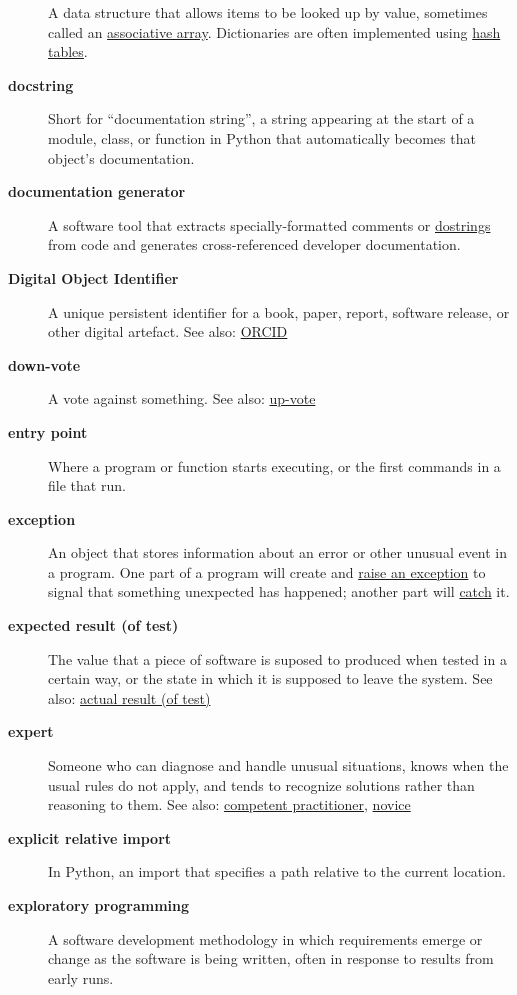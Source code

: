 \documentclass[
]{krantz}
\begin{document}
\begin{description}
A data structure that allows items to be looked up by value, sometimes called an \protect\hyperlink{associative_array}{associative array}. Dictionaries are often implemented using \protect\hyperlink{hash_table}{hash tables}.
\item[\textbf{docstring}]
Short for ``documentation string'', a string appearing at the start of a module, class, or function in Python that automatically becomes that object's documentation.
\item[\textbf{documentation generator}]
A software tool that extracts specially-formatted comments or \protect\hyperlink{docstring}{dostrings} from code and generates cross-referenced developer documentation.
\item[\textbf{Digital Object Identifier}]
A unique persistent identifier for a book, paper, report, software release, or other digital artefact. See also: \protect\hyperlink{orcid}{ORCID}
\item[\textbf{down-vote}]
A vote against something. See also: \protect\hyperlink{up_vote}{up-vote}
\item[\textbf{entry point}]
Where a program or function starts executing, or the first commands in a file that run.
\item[\textbf{exception}]
An object that stores information about an error or other unusual event in a program. One part of a program will create and \protect\hyperlink{raise_exception}{raise an exception} to signal that something unexpected has happened; another part will \protect\hyperlink{catch_exception}{catch} it.
\item[\textbf{expected result (of test)}]
The value that a piece of software is suposed to produced when tested in a certain way, or the state in which it is supposed to leave the system. See also: \protect\hyperlink{actual_result}{actual result (of test)}
\item[\textbf{expert}]
Someone who can diagnose and handle unusual situations, knows when the usual rules do not apply, and tends to recognize solutions rather than reasoning to them. See also: \protect\hyperlink{competent_practitioner}{competent practitioner}, \protect\hyperlink{novice}{novice}
\item[\textbf{explicit relative import}]
In Python, an import that specifies a path relative to the current location.
\item[\textbf{exploratory programming}]
A software development methodology in which requirements emerge or change as the software is being written, often in response to results from early runs.

\end{description}
\end{document}
